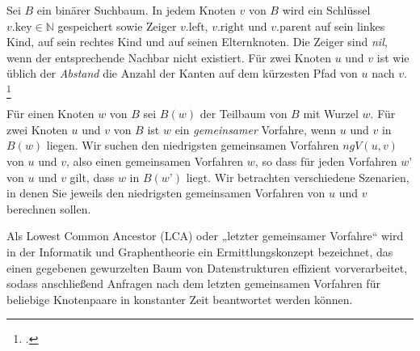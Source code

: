 \documentclass{lehramt-informatik-aufgabe}
\begin{document}

Sei $B$ ein binärer Suchbaum. In jedem Knoten $v$ von $B$ wird ein
Schlüssel $v.\text{key} \in \mathbb{N}$ gespeichert sowie Zeiger
$v.\text{left}$, $v.\text{right}$ und $v.\text{parent}$ auf sein linkes
Kind, auf sein rechtes Kind und auf seinen Elternknoten. Die Zeiger sind
\emph{nil}, wenn der entsprechende Nachbar nicht existiert. Für zwei
Knoten $u$ und $v$ ist wie üblich der \emph{Abstand} die Anzahl der
Kanten auf dem kürzesten Pfad von $u$ nach $v$.
\footcite{examen:66115:2020:03}

Für einen Knoten $w$ von $B$ sei $B(w)$ der Teilbaum von $B$ mit Wurzel
$w$. Für zwei Knoten $u$ und $v$ von $B$ ist $w$ ein \emph{gemeinsamer}
Vorfahre, wenn $u$ und $v$ in $B(w)$ liegen. Wir suchen den niedrigsten
gemeinsamen Vorfahren $ngV(u,v)$ von $u$ und $v$, also einen gemeinsamen
Vorfahren $w$, so dass für jeden Vorfahren $w’$ von $u$ und $v$ gilt,
dass $w$ in $B(w’)$ liegt. Wir betrachten verschiedene Szenarien, in
denen Sie jeweils den niedrigsten gemeinsamen Vorfahren von $u$ und $v$
berechnen sollen.

\begin{liExkurs}
Als Lowest Common Ancestor (LCA) oder „letzter gemeinsamer Vorfahre“
wird in der Informatik und Graphentheorie ein Ermittlungskonzept
bezeichnet, das einen gegebenen gewurzelten Baum von Datenstrukturen
effizient vorverarbeitet, sodass anschließend Anfragen nach dem letzten
gemeinsamen Vorfahren für beliebige Knotenpaare in konstanter Zeit
beantwortet werden können.
\end{liExkurs}
\end{document}
